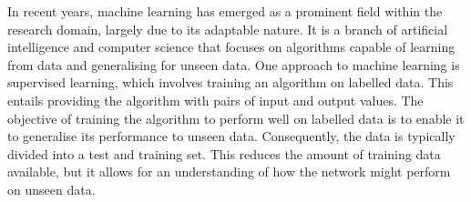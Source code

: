 \documentclass[
a4paper, 
12pt,
grayscalebody, %
abstract=on,
twoside, BCOR10mm, 12pt, DIV13,headinclude, footexclude, final, abstracton, openright
]{ibireprt}
\numberwithin{equation}{chapter}
\numberwithin{table}{chapter}
\numberwithin{figure}{chapter}
\numberwithin{algorithm}{chapter}
\numberwithin{example}{chapter}
\numberwithin{example}{chapter}
\begin{document}
 





In recent years, machine learning has emerged as a prominent field within the research domain, largely due to its adaptable nature. It is a branch of artificial intelligence and computer science that focuses on algorithms capable of learning from data and generalising for unseen data. One approach to machine learning is supervised learning, which involves training an algorithm on labelled data. This entails providing the algorithm with pairs of input and output values. The objective of training the algorithm to perform well on labelled data is to enable it to generalise its performance to unseen data. Consequently, the data is typically divided into a test and training set. This reduces the amount of training data available, but it allows for an understanding of how the network might perform on unseen data.
 
\end{document}
